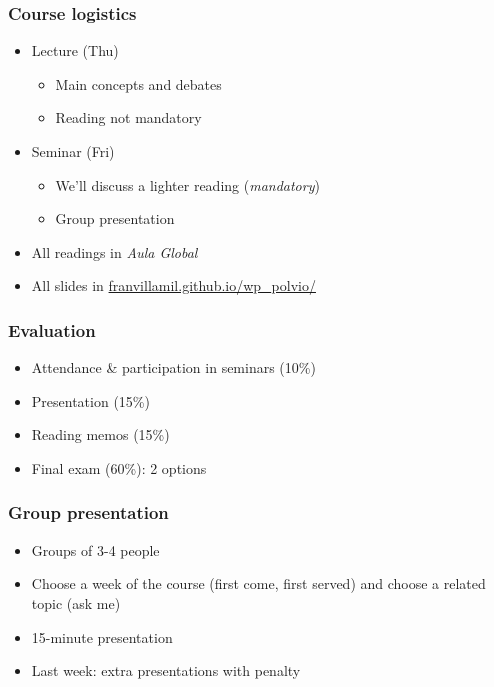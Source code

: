 \documentclass[aspectratio=43]{beamer}
\begin{document}
\begin{frame}
\frametitle{Course logistics}
\centering

\begin{itemize}
\item Lecture (Thu)
  \begin{itemize}
    \item Main concepts and debates
    \item Reading not mandatory
  \end{itemize}
\item Seminar (Fri)
  \begin{itemize}
    \item We'll discuss a lighter reading (\textit{mandatory})
    \item Group presentation
  \end{itemize}
\item All readings in \textit{Aula Global}
\item All slides in \href{https://franvillamil.github.io/wp_polvio/}{franvillamil.github.io/wp\_polvio/}
\end{itemize}

\end{frame}

\begin{frame}
\frametitle{Evaluation}
\centering

\begin{itemize}
\item Attendance \& participation in seminars (10\%)
\item Presentation (15\%)
\item Reading memos (15\%)
\item Final exam (60\%): 2 options
\end{itemize}

\end{frame}

\begin{frame}
\frametitle{Group presentation}
\centering

\begin{itemize}
  \item Groups of 3-4 people
  \item Choose a week of the course (first come, first served) and choose a related topic (ask me)
  \item 15-minute presentation
  \item Last week: extra presentations with penalty
\end{itemize}

\end{frame}
\end{document}
